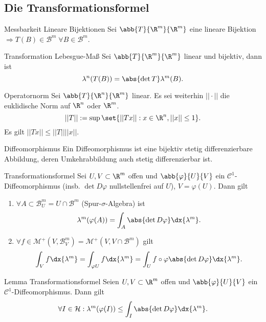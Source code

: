 \subsection*{Die Transformationsformel}

\begin{karte}{Messbarkeit Lineare Bijektionen}
    Sei \( \abb{T}{\R^m}{\R^m} \) eine lineare Bijektion 
    \( \Rightarrow T(B) \in \mathcal{B}^m \;\forall B\in \mathcal{B}^m \).
\end{karte}

\begin{karte}{Transformation Lebesgue-Maß}
    Sei \( \abb{T}{\R^m}{\R^m} \) linear und bijektiv, 
    dann ist 
    \[ \lambda^n(T(B)) = \abs{\det T} \lambda^m(B). \]
\end{karte}

\begin{karte}{Operatornorm}
    Sei \( \abb{T}{\R^n}{\R^m} \) linear. Es sei weiterhin 
    \( ||\cdot|| \) die euklidische Norm auf \(\R^n \) oder \(\R^m\). 
    \[ ||T|| := \sup\set{||Tx||:x\in \R^n, ||x||\leq 1}. \]
    Es gilt 
    \( ||Tx|| \leq ||T|| ||x|| \).
\end{karte}

\begin{karte}{Diffeomorphismus}
    Ein Diffeomorphismus ist eine bijektiv stetig differenzierbare Abbildung, 
    deren Umkehrabbildung auch stetig differenzierbar ist.
\end{karte}

\begin{karte}{Transformationsformel}
    Sei \( U,V\subset \R^m \) offen und \( \abb{\varphi}{U}{V} \) 
    ein \( \mathcal{C}^1 \)-Diffeomorphismus (insb. \( \det D\varphi \) nullstellenfrei auf \(U\)), 
    \(V = \varphi(U)\). Dann gilt 
    \begin{enumerate}
        \item \( \forall A \subset \mathcal{B}_U^m = U \cap \mathcal{B}^m\) (Spur-\(\sigma\)-Algebra) ist 
        \[ \lambda^m(\varphi(A)) = \int_A \abs{\det D\varphi} \dx{\lambda^m}. \]
        \item \( \forall f\in \mathcal{M}^+(V, \mathcal{B}_V^m) 
        = \mathcal{M}^+(V, V \cap \mathcal{B}^m) \) gilt 
        \[ \int_V f \dx{\lambda^m} = \int_{\varphi U} f \dx{\lambda^m} 
        = \int_U f\circ \varphi \abs{\det D\varphi} \dx{\lambda^m}. \]
    \end{enumerate}
\end{karte}

\begin{karte}{Lemma Transformationsformel}
    Seien \(U, V \subset \R^m\) offen und \( \abb{\varphi}{U}{V} \) ein 
    \( \mathcal{C}^1 \)-Diffeomorphismus. Dann gilt 
    \[ \forall I \in \mathcal{H}: \lambda^m(\varphi(I)) \leq \int_I \abs{\det D\varphi} \dx{\lambda^m}. \]
\end{karte}